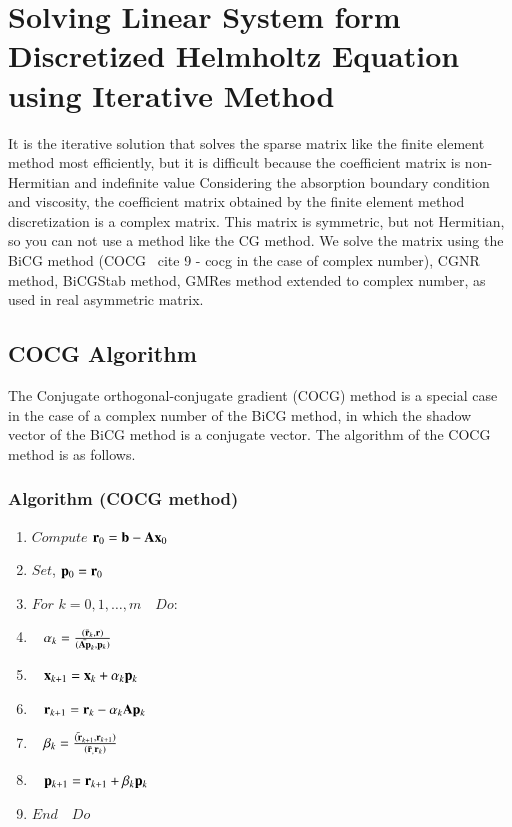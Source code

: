 \section{Solving Linear System form Discretized Helmholtz Equation using Iterative Method}
It is the iterative solution that solves the sparse matrix like the finite element method most efficiently, but it is difficult because the coefficient matrix is ​​non-Hermitian and indefinite value
Considering the absorption boundary condition and viscosity, the coefficient matrix obtained by the finite element method discretization is a complex matrix. This matrix is ​​symmetric, but not Hermitian, so you can not use a method like the CG method. We solve the matrix using the BiCG method (COCG \ cite {9 - cocg} in the case of complex number), CGNR method, BiCGStab method, GMRes method extended to complex number, as used in real asymmetric matrix.

\subsection{COCG Algorithm}
The Conjugate orthogonal-conjugate gradient (COCG) method is a special case in the case of a complex number of the BiCG method, in which the shadow vector of the BiCG method is a conjugate vector. The algorithm of the COCG method is as follows.

\subsubsection{Algorithm (COCG method)}

\begin{enumerate}
\item $Compute$ $\mathbf{r}_0=\mathbf{b}-\mathbf{A}\mathbf{x}_0$
\item $Set$, $\mathbf{p}_0=\mathbf{r}_0$
\item $For$ $k=0,1,\ldots,m\quad$$Do:$
\item $\;\;\; \alpha_k=\frac{(\bar{\mathbf{r}}_k,\mathbf{r})}{(\bar{\mathbf{A}\mathbf{p}}_k,\mathbf{p}_k)}$
\item $\;\;\; \mathbf{x}_{k+1}=\mathbf{x}_k+\alpha_k\mathbf{p}_k$
\item $\;\;\; \mathbf{r}_{k+1}=\mathbf{r}_k-\alpha_k\mathbf{A}\mathbf{p}_k$
\item $\;\;\; \beta_k=\frac{\bar{(\mathbf{r}}_{k+1},\mathbf{r}_{k+1})}{(\bar{\mathbf{r}}_,\mathbf{r}_k)}$
\item $\;\;\; \mathbf{p}_{k+1}=\mathbf{r}_{k+1}+\beta_k\mathbf{p}_k$
\item $End \quad Do$
\end{enumerate}

